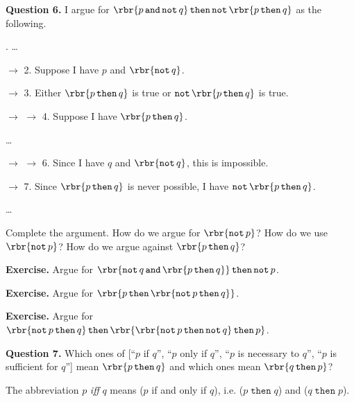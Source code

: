 \documentclass[12pt]{article}
\def\opthen{\mathop{\mathtt{then}}}
\def\opand{\mathop{\mathtt{and}}}
\def\opnot{\mathop{\mathtt{not}}}
\begin{document}
\leavevmode

\hspace{-0.75in} \textbf{Question 6.} I argue for $ \rbr{ p \opand \opnot q } \opthen \opnot \rbr{ p \opthen q } $ as the following.
\begin{mdframed}
. \ldots{}

\noindent $\longrightarrow$ 2. Suppose I have $p$ and $ \rbr{ \opnot q } $.

\noindent $\longrightarrow$ 3. Either $ \rbr{ p \opthen q } $ is true or $ \opnot \rbr{ p \opthen q } $ is true.

\noindent $\longrightarrow$ $\longrightarrow$ 4. Suppose I have $ \rbr{ p \opthen q } $.

\noindent \ldots{}

\noindent $\longrightarrow$ $\longrightarrow$ 6. Since I have $q$ and $ \rbr{ \opnot q } $, this is impossible.

\noindent $\longrightarrow$ 7. Since $ \rbr{ p \opthen q } $ is never possible, I have $ \opnot \rbr{ p \opthen q } $.

\noindent \ldots{}

\end{mdframed}
Complete the argument. How do we argue for $ \rbr{ \opnot p } $? How do we use $ \rbr{ \opnot p } $? How do we argue against $ \rbr{ p \opthen q } $?

\leavevmode

\hspace{-0.75in}\llap{> } \textbf{Exercise.} Argue for $ \rbr{ \opnot q \opand \rbr{ p \opthen q } } \opthen \opnot p $.

\hspace{-0.75in}\llap{> } \textbf{Exercise.} Argue for $ \rbr{ p \opthen \rbr{ \opnot p \opthen q } } $.

\hspace{-0.75in}\llap{> } \textbf{Exercise.} Argue for $ \rbr{ \opnot p \opthen q } \opthen \rbr{ \rbr{ \opnot p \opthen \opnot q } \opthen p } $.

\leavevmode

\hspace{-0.75in} \textbf{Question 7.} Which ones of [``$p$ if $q$'', ``$p$ only if $q$'', ``$p$ is necessary to $q$'', ``$p$ is sufficient for $q$''] mean $ \rbr{ p \opthen q } $ and which ones mean $ \rbr{ q \opthen p } $?

\leavevmode

The abbreviation $p$ \emph{iff} $q$ means ($p$ if and only if $q$), i.e. ($ p \opthen q $) and ($ q \opthen p $).
\end{document}
